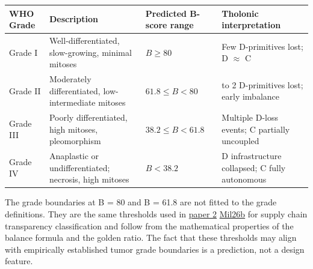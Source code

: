 \documentclass[12pt]{article}
\begin{document}
\begin{longtable}[]{@{}
  >{\raggedright\arraybackslash}p{}
  >{\raggedright\arraybackslash}p{}
  >{\raggedright\arraybackslash}p{}
  >{\raggedright\arraybackslash}p{}@{}}
\toprule\noalign{}
\begin{minipage}[b]{\linewidth}\raggedright
WHO Grade
\end{minipage} & \begin{minipage}[b]{\linewidth}\raggedright
Description
\end{minipage} & \begin{minipage}[b]{\linewidth}\raggedright
Predicted B-score range
\end{minipage} & \begin{minipage}[b]{\linewidth}\raggedright
Tholonic interpretation
\end{minipage} \\
\midrule\noalign{}
\endhead
\bottomrule\noalign{}
\endlastfoot
Grade I & Well-differentiated, slow-growing, minimal mitoses &
\(B \geq 80\) & Few D-primitives lost; D \(\approx\) C \\
Grade II & Moderately differentiated, low-intermediate mitoses &
\(61.8 \leq B < 80\) & 1 to 2 D-primitives lost; early imbalance \\
Grade III & Poorly differentiated, high mitoses, pleomorphism &
\(38.2 \leq B < 61.8\) & Multiple D-loss events; C partially
uncoupled \\
Grade IV & Anaplastic or undifferentiated; necrosis, high mitoses &
\(B < 38.2\) & D infrastructure collapsed; C fully autonomous \\
\end{longtable}

The grade boundaries at B = 80 and B = 61.8 are not fitted to the grade
definitions. They are the same thresholds used in
\href{https://github.com/baardev/truevalue/blob/main/docnav/Research/papers/2_supply-chain-transparency-tvpci/2_supply-chain-transparency-tvpci.pdf}{paper
2}
\href{https://github.com/baardev/truevalue/blob/main/docnav/Research/papers/2_supply-chain-transparency-tvpci/2_supply-chain-transparency-tvpci.pdf}{Mil26b}
for supply chain transparency classification and follow from the
mathematical properties of the balance formula and the golden ratio. The
fact that these thresholds may align with empirically established tumor
grade boundaries is a prediction, not a design feature.
\end{document}
